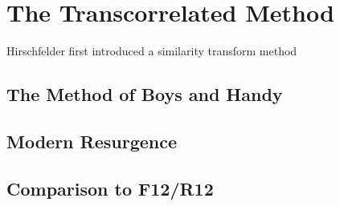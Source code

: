 \section{The Transcorrelated Method}
\label{sec:tc}

Hirschfelder first introduced a similarity transform method \cite{hirschfelderRemoval1963}


\subsection{The Method of Boys and Handy}

\subsection{Modern Resurgence}

\subsection{Comparison to F12/R12}
